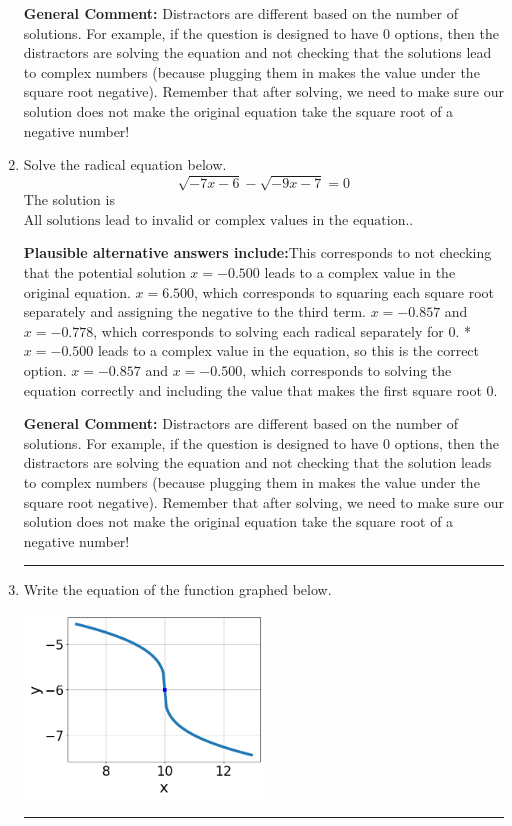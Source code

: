 \documentclass{extbook}[14pt]
\newcommand{\litem}[1]{\item #1

\rule{\textwidth}{0.4pt}}
\begin{document}
\begin{enumerate}
{\textbf{General Comment:} Distractors are different based on the number of solutions. For example, if the question is designed to have 0 options, then the distractors are solving the equation and not checking that the solutions lead to complex numbers (because plugging them in makes the value under the square root negative). Remember that after solving, we need to make sure our solution does not make the original equation take the square root of a negative number!
}
\litem{
Solve the radical equation below.
\[ \sqrt{-7 x - 6} - \sqrt{-9 x - 7} = 0 \]The solution is \( \text{All solutions lead to invalid or complex values in the equation.} \).\begin{enumerate}[label=\Alph*.]
\textbf{Plausible alternative answers include:}This corresponds to not checking that the potential solution $x = -0.500$ leads to a complex value in the original equation.
$x = 6.500$, which corresponds to squaring each square root separately and assigning the negative to the third term.
$x = -0.857$ and $x = -0.778$, which corresponds to solving each radical separately for 0.
*$x = -0.500$ leads to a complex value in the equation, so this is the correct option.
$x = -0.857$ and $x = -0.500$, which corresponds to solving the equation correctly and including the value that makes the first square root 0.
\end{enumerate}

\textbf{General Comment:} Distractors are different based on the number of solutions. For example, if the question is designed to have 0 options, then the distractors are solving the equation and not checking that the solution leads to complex numbers (because plugging them in makes the value under the square root negative). Remember that after solving, we need to make sure our solution does not make the original equation take the square root of a negative number!
}
\litem{
Write the equation of the function graphed below.

\begin{center}
    \includegraphics[width=0.5\textwidth]{../Figures/radicalGraphToEquationB.png}
\end{center}


}
\end{enumerate}
\end{document}
